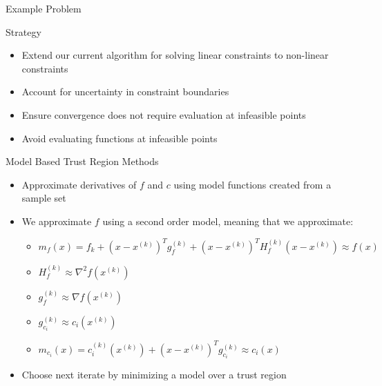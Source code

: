 \documentclass{beamer}
\newcommand{\xk}{{{x}^{(k)}}}
\newcommand{\mk}{{m_f}}
\newcommand{\fk}{{f_k}}
\newcommand{\fgk}{{g^{(k)}_f}}
\newcommand{\fhk}{{H^{(k)}_f}}
\newcommand{\ck}{{c^{(k)}_{i}(\xk)}}
\newcommand{\cgk}{{g^{(k)}_{c_i}}}
\newcommand{\mck}{{m_{c_i}}}
\begin{document}
\begin{frame}{Example Problem}

\end{frame}


\begin{frame}{Strategy}
    \begin{itemize}
        \item Extend our current algorithm for solving linear constraints to non-linear constraints
        \item Account for uncertainty in constraint boundaries
        \item Ensure convergence does not require evaluation at infeasible points
        \item Avoid evaluating functions at infeasible points
    \end{itemize}
\end{frame}





\begin{frame}{Model Based Trust Region Methods}
    \begin{itemize}
        \setlength\itemsep{2em}
    	\item Approximate derivatives of $f$ and $c$ using model functions created from a sample set
    	\item We approximate $f$ using a second order model, meaning that we approximate:
    	\begin{itemize}
            \item $\mk(x) = \fk + \left(x - \xk \right)^T\fgk + \left(x - \xk \right)^T\fhk\left(x - \xk \right) \approx f(x)$
            \item $\fhk \approx \nabla ^2 f(\xk)$
            \item $\fgk \approx \nabla f(\xk)$
            \item $\cgk \approx c_i(\xk)$
            \item $\mck(x) = \ck + \left(x - \xk\right)^T\cgk \approx c_i(x)$
    	\end{itemize}
	    \item Choose next iterate by minimizing a model over a trust region
	\end{itemize}
\end{frame}
\end{document}
